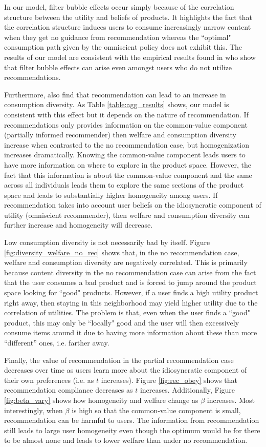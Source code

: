 \documentclass[sigconf]{acmart}
\begin{document}
In our model, filter bubble effects occur simply because of the correlation structure between the utility and beliefs of products. It highlights the fact that the correlation structure induces users to consume increasingly narrow content when they get no guidance from recommendation whereas the ``optimal" consumption path given by the omniscient policy does not exhibit this. The results of our model are consistent with the empirical results found in \cite{nguyen2014exploring} who show that filter bubble effects can arise even amongst users who do not utilize recommendations.
\par
Furthermore, \cite{nguyen2014exploring} also find that recommendation can lead to an increase in consumption diversity. As Table \ref{table:agg_results} shows, our model is consistent with this effect but it depends on the nature of recommendation. If recommendations only provides information on the common-value component (partially informed recommender) then welfare and consumption diversity increase when contrasted to the no recommendation case, but homogenization increases dramatically. Knowing the common-value component leads users to have more information on where to explore in the product space. However, the fact that this information is about the common-value component and the same across all individuals leads them to explore the same sections of the product space and leads to substantially higher homogeneity among users. If recommendation takes into account user beliefs on the idiosyncratic component of utility (omniscient recommender), then welfare and consumption diversity can further increase and homogeneity will decrease.
\par
Low consumption diversity is not necessarily bad by itself. Figure \ref{fig:diversity_welfare_no_rec} shows that, in the no recommendation case, welfare and consumption diversity are negatively correlated. This is primarily because content diversity in the no recommendation case can arise from the fact that the user consumes a bad product and is forced to jump around the product space looking for ``good" products. However, if a user finds a high utility product right away, then staying in this neighborhood may yield higher utility due to the correlation of utilities. The problem is that, even when the user finds a ``good" product, this may only be ``locally" good and the user will then excessively consume items around it due to having more information about these than more ``different'' ones, i.e. farther away.
\par
Finally, the value of recommendation in the partial recommendation case decreases over time as users learn more about the idiosyncratic component of their own preferences (i.e. as $t$ increases). Figure \ref{fig:rec_obey} shows that recommendation compliance decreases as $t$ increases. Additionally, Figure \ref{fig:beta_vary} shows how homogeneity and welfare change as $\beta$ increases. Most interestingly, when $\beta$ is high so that the common-value component is small, recommendation can be harmful to users. The information from recommendation still leads to large user homogeneity even though the optimum would be for there to be almost none and leads to lower welfare than under no recommendation.
\end{document}
